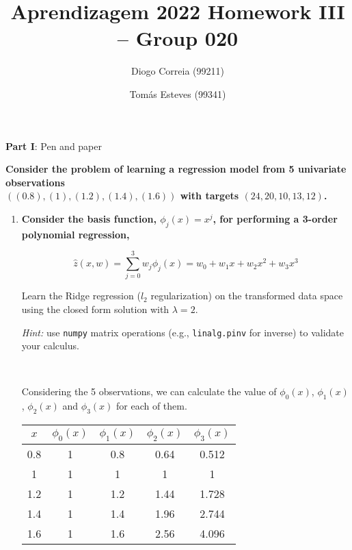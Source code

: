 \documentclass[12pt]{article}
\title{\large{Aprendizagem 2022}\vskip 0.2cm Homework III -- Group 020}
\date{}
\author{Diogo Correia (99211) \and Tomás Esteves (99341)}
\begin{document}
\maketitle
\begin{center}
    \large{\vskip -1.0cm\textbf{Part I}: Pen and paper}
\end{center}

{
\color{questioncolor}\bfseries
\noindent
Consider the problem of learning a regression model from 5 univariate observations\\
$\left((0.8), (1), (1.2), (1.4), (1.6)\right)$ with targets $\left(24, 20, 10, 13, 12\right)$.
}

\begin{enumerate}[leftmargin=\labelsep]
    \item {\color{questioncolor}\bfseries
          Consider the basis function, $\phi_j (x) = x^j$, for performing a 3-order
          polynomial regression,

          $$
              \hat{z}(x, w) = \sum_{j=0}^{3} w_j \phi_j (x)
              = w_0 + w_1 x + w_2 x^2 + w_3 x^3
          $$

          Learn the Ridge regression ($l_2$ regularization) on the transformed data
          space using the closed form solution with $\lambda = 2$.

          \textit{Hint:} use \texttt{numpy} matrix operations (e.g., \texttt{linalg.pinv} for inverse)
          to validate your calculus.
          }\\
          \vspace{0.5em}

          Considering the 5 observations, we can calculate the value of
          $\phi_0 (x)$, $\phi_1 (x)$, $\phi_2 (x)$ and $\phi_3 (x)$ for each
          of them.

          \begin{center}
              \captionsetup{type=table}
              \begin{tabular}{c|cccc}
                  $x$ & $\phi_0(x)$ & $\phi_1(x)$ & $\phi_2(x)$ & $\phi_3(x)$ \\
                  \hline
                  0.8 & 1           & 0.8         & 0.64        & 0.512       \\
                  1   & 1           & 1           & 1           & 1           \\
                  1.2 & 1           & 1.2         & 1.44        & 1.728       \\
                  1.4 & 1           & 1.4         & 1.96        & 2.744       \\
                  1.6 & 1           & 1.6         & 2.56        & 4.096
              \end{tabular}
              \label{ex1-phi-table}
          \end{center}


\end{enumerate}
\end{document}
